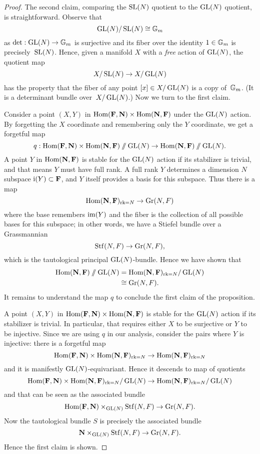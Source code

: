 \documentclass[11pt]{amsart}
\begin{document}

\begin{proof}
The second claim, comparing the $\operatorname{SL}(N)$ quotient to the $\operatorname{GL}(N)$ quotient, is straightforward.
Observe that
\[
\operatorname{GL}(N)/\operatorname{SL}(N) \cong \mathbb G_m
\]
as $\det: \operatorname{GL}(N) \to \mathbb G_m$ is surjective and its fiber over the identity $1 \in \mathbb G_m$ is precisely~$\operatorname{SL}(N)$.
Hence, given a manifold $X$ with a {\em free} action of $\operatorname{GL}(N)$, 
the quotient map
\[
X/\operatorname{SL}(N) \to X/\operatorname{GL}(N)
\]
has the property that the fiber of any point $[x] \in X/\operatorname{GL}(N)$ is a copy of~$\mathbb G_m$.
(It is a determinant bundle over~$X/\operatorname{GL}(N)$.)
Now we turn to the first claim.

Consider a point $(X,Y)$ in ${\rm Hom}(\mathbf F, \mathbf N) \times {\rm Hom}(\mathbf N,\mathbf F)$ under the $\operatorname{GL}(N)$ action.
By forgetting the $X$ coordinate and remembering only the $Y$ coordinate, 
we get a forgetful map
\[
q: {\rm Hom}(\mathbf F, \mathbf N) \times {\rm Hom}(\mathbf N,\mathbf F)\mathbin{/\mkern-6mu/}\operatorname{GL}(N) \to {\rm Hom}(\mathbf N,\mathbf F)\mathbin{/\mkern-6mu/} \operatorname{GL}(N).
\]
A point $Y$ in ${\rm Hom}(\mathbf N,\mathbf F)$ is stable for the $\operatorname{GL}(N)$ action if its stabilizer is trivial,
and that means $Y$ must have full rank.
A full rank $Y$ determines a dimension $N$ subspace $\mathrm{i}(Y) \subset \mathbf F$,
and $Y$ itself provides a basis for this subspace.
Thus there is a map
\[
{\rm Hom}(\mathbf N,\mathbf F)_{\operatorname{rk} = N} \to {\rm Gr}(N,F) 
\]
where the base remembers $\operatorname{im}(Y)$ and the fiber is the collection of all possible bases for this subspace;
in other words, we have a Stiefel bundle over a Grassmannian
\[
\operatorname{Stf}(N,F) \to {\rm Gr}(N,F),
\]
which is the tautological principal $\operatorname{GL}(N)$-bundle.
Hence we have shown that
\begin{align*}
{\rm Hom}(\mathbf N,\mathbf F)\mathbin{/\mkern-6mu/} \operatorname{GL}(N) 
&= {\rm Hom}(\mathbf N,\mathbf F)_{\operatorname{rk} = N}/\operatorname{GL}(N)\\
&\cong {\rm Gr}(N,F).
\end{align*}
It remains to understand the map $q$ to conclude the first claim of the proposition.

A point $(X,Y)$ in ${\rm Hom}(\mathbf F, \mathbf N) \times {\rm Hom}(\mathbf N,\mathbf F)$ is stable for the $\operatorname{GL}(N)$ action if its stabilizer is trivial.
In particular, that requires either $X$ to be surjective or $Y$ to be injective.
Since we are using $q$ in our analysis, consider the pairs where $Y$ is injective:
there is a forgetful map
\[
{\rm Hom}(\mathbf F, \mathbf N) \times {\rm Hom}(\mathbf N,\mathbf F)_{\operatorname{rk} = N} \to {\rm Hom}(\mathbf N,\mathbf F)_{\operatorname{rk} = N}
\]
and it is manifestly $\operatorname{GL}(N)$-equivariant.
Hence it descends to map of quotients
\[
{\rm Hom}(\mathbf F, \mathbf N) \times {\rm Hom}(\mathbf N,\mathbf F)_{\operatorname{rk} = N}/\operatorname{GL}(N) \to {\rm Hom}(\mathbf N,\mathbf F)_{\operatorname{rk} = N}/\operatorname{GL}(N)
\]
and that can be seen as the  associated bundle
\[
{\rm Hom}(\mathbf F,\mathbf N) \times_{\operatorname{GL}(N)} \operatorname{Stf}(N,F) \to {\rm Gr}(N,F).
\]
Now the tautological bundle $S$ is precisely the associated bundle
\[
\mathbf N \times_{\operatorname{GL}(N)} \operatorname{Stf}(N,F) \to {\rm Gr}(N,F).
\]
Hence the first claim is shown.
\end{proof}
\end{document}
